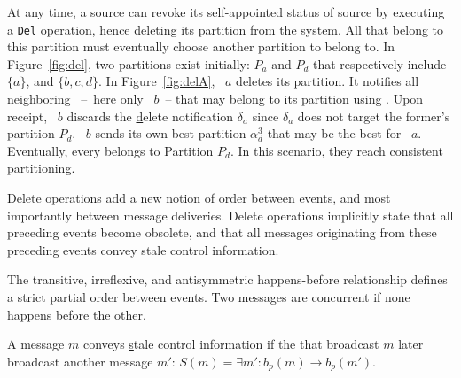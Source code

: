 At any time, a source can revoke its self-appointed status of source
by executing a \texttt{Del} operation, hence deleting its partition
from the system. All \processes that belong to this partition must
eventually choose another partition to belong to. In
Figure~\ref{fig:del}, two partitions exist initially: $P_a$ and $P_d$
that respectively include $\{a\}$, and $\{b, c, d\}$. In
Figure~\ref{fig:delA}, \Process~$a$ deletes its partition. It notifies
all neighboring \processes~--~here only \Process~$b$~-- that may
belong to its partition using \NAMEB. Upon receipt, \Process~$b$
discards the \underline{d}elete notification $\delta_a$ since
$\delta_a$ does not target the former's partition $P_d$. \Process~$b$
sends its own best partition $\alpha_d^3$ that may be the best for
\Process~$a$. Eventually, every \process belongs to Partition
$P_d$. In this scenario, they reach consistent partitioning.

Delete operations add a new notion of order between events, and most
importantly between message deliveries. Delete operations implicitly
state that all preceding events become obsolete, and that all messages
originating from these preceding events convey stale control
information.

\begin{definition}
  The transitive, irreflexive, and antisymmetric happens-before
  relationship defines a strict partial order between events. Two
  messages are concurrent if none happens before the other.
\end{definition}

\begin{definition}
  A message $m$ conveys \underline{s}tale control information if the
  \process that broadcast $m$ later broadcast another message $m'$:
  $S(m) = \exists m': b_p(m) \rightarrow b_p(m')$.

\end{definition}





